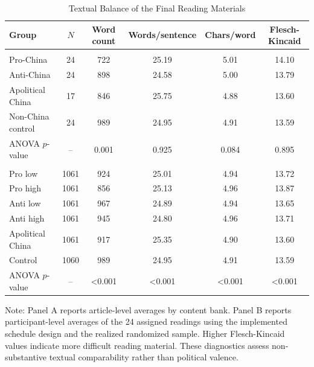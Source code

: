\begin{table}[H]
\centering
\begin{threeparttable}
\caption{Textual Balance of the Final Reading Materials}
\label{tab:text_balance}
\footnotesize
\begin{tabular}{lccccc}
\toprule
Group & $N$ & Word count & Words/sentence & Chars/word & Flesch-Kincaid\\
\midrule
\addlinespace[0.3em]
\multicolumn{6}{l}{\textit{Panel A. Article pools}}\\
Pro-China & 24 & 722 & 25.19 & 5.01 & 14.10\\
Anti-China & 24 & 898 & 24.58 & 5.00 & 13.79\\
Apolitical China & 17 & 846 & 25.75 & 4.88 & 13.60\\
Non-China control & 24 & 989 & 24.95 & 4.91 & 13.59\\
ANOVA $p$-value & -- & 0.001 & 0.925 & 0.084 & 0.895\\
\addlinespace[0.45em]
\multicolumn{6}{l}{\textit{Panel B. Average assigned 24-reading bundle by group}}\\
Pro low & 1061 & 924 & 25.01 & 4.94 & 13.72\\
Pro high & 1061 & 856 & 25.13 & 4.96 & 13.87\\
Anti low & 1061 & 967 & 24.89 & 4.94 & 13.65\\
Anti high & 1061 & 945 & 24.80 & 4.96 & 13.71\\
Apolitical China & 1061 & 917 & 25.35 & 4.90 & 13.60\\
Control & 1060 & 989 & 24.95 & 4.91 & 13.59\\
ANOVA $p$-value & -- & <0.001 & <0.001 & <0.001 & <0.001\\
\bottomrule
\end{tabular}
\begin{tablenotes}
\footnotesize
\item Note: Panel A reports article-level averages by content bank. Panel B reports participant-level averages of the 24 assigned readings using the implemented schedule design and the realized randomized sample. Higher Flesch-Kincaid values indicate more difficult reading material. These diagnostics assess non-substantive textual comparability rather than political valence.
\end{tablenotes}
\end{threeparttable}
\end{table}
